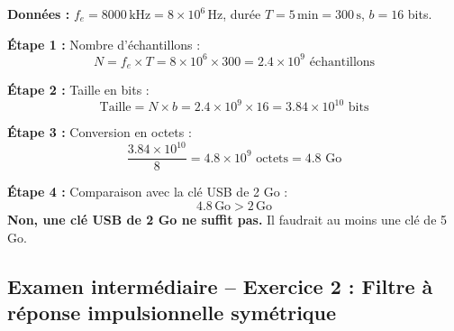 \documentclass[12pt,a4paper]{article}
\newcommand{\step}[1]{\textcolor{coursbleu}{\textbf{Étape #1 :}}}
\begin{document}
\begin{tcolorbox}[corrbox, title=Correction Exercice 2]
\textbf{Données :} $f_e = 8000\,\text{kHz} = 8\times 10^6\,\text{Hz}$, durée $T = 5\,\text{min} = 300\,\text{s}$,
$b = 16$ bits.

\step{1} Nombre d'échantillons :
\[
  N = f_e \times T = 8\times 10^6 \times 300 = 2.4\times 10^9 \text{ échantillons}
\]

\step{2} Taille en bits :
\[
  \text{Taille} = N \times b = 2.4\times 10^9 \times 16 = 3.84\times 10^{10} \text{ bits}
\]

\step{3} Conversion en octets :
\[
  \frac{3.84\times 10^{10}}{8} = 4.8\times 10^9 \text{ octets} = 4.8 \text{ Go}
\]

\step{4} Comparaison avec la clé USB de 2 Go :
\[
  4.8\,\text{Go} > 2\,\text{Go}
\]
\textbf{Non, une clé USB de 2 Go ne suffit pas.} Il faudrait au moins une clé de 5 Go.
\end{tcolorbox}

\subsection{Examen intermédiaire -- Exercice 2 : Filtre à réponse impulsionnelle symétrique}
\end{document}
